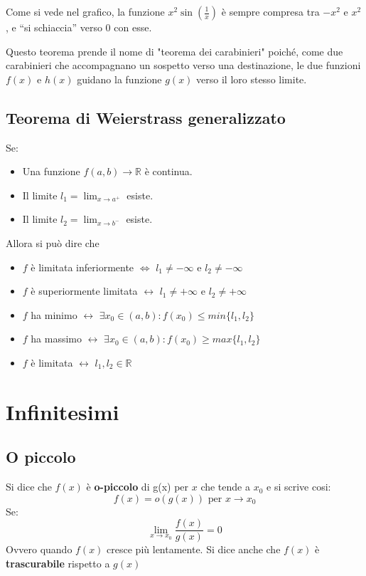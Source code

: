 \documentclass[12pt,a4paper]{article}
\let\oldsection\section
\renewcommand{\section}{\clearpage\oldsection}
\begin{document}
Come si vede nel grafico, la funzione $x^2 \sin\left(\tfrac{1}{x}\right)$ è sempre compresa tra $-x^2$ e $x^2$, e ``si schiaccia'' verso $0$ con esse.

\vspace{1em}

Questo teorema prende il nome di "teorema dei carabinieri" poiché, come due carabinieri che accompagnano un sospetto verso una destinazione, le due funzioni $f(x)$ e $h(x)$ guidano la funzione $g(x)$ verso il loro stesso limite.

\subsection{Teorema di Weierstrass generalizzato}

Se:
\begin{itemize}
    \item Una funzione $f(a,b) \rightarrow \mathbb{R}$ è continua.
    \item Il limite $l_1 = \lim_{x \to a^+}$ esiste.
    \item Il limite $l_2 = \lim_{x \to b^-}$ esiste.
\end{itemize}
Allora si può dire che
\begin{itemize}
    \item $f$ è limitata inferiormente $\Leftrightarrow$ $l_1 \ne -\infty$ e $l_2 \ne -\infty$
    \item $f$ è superiormente limitata $\leftrightarrow$ $l_1 \ne +\infty$ e $l_2 \ne +\infty$
    \item $f$ ha minimo $\leftrightarrow$ $\exists x_0 \in (a,b) : f(x_0) \le min \{l_1,l_2\}$
    \item $f$ ha massimo $\leftrightarrow$ $\exists x_0 \in (a,b) : f(x_0) \ge max \{l_1,l_2\}$
    \item $f$ è limitata $\leftrightarrow$ $l_1,l_2 \in \mathbb{R}$
\end{itemize}

\section{Infinitesimi}
\subsection{O piccolo}
Si dice che $f(x)$ è \textbf{o-piccolo} di g(x) per $x$ che tende a $x_0$ e si scrive cosi:
\[
f(x) = o(g(x)) \text{ per } x \rightarrow x_0
\]
Se:
\[
\lim_{x \to x_0} \frac{f(x)}{g(x)} = 0
\]
Ovvero quando $f(x)$ cresce più lentamente.
Si dice anche che $f(x)$ è \textbf{trascurabile} rispetto a $g(x)$\\
\end{document}
